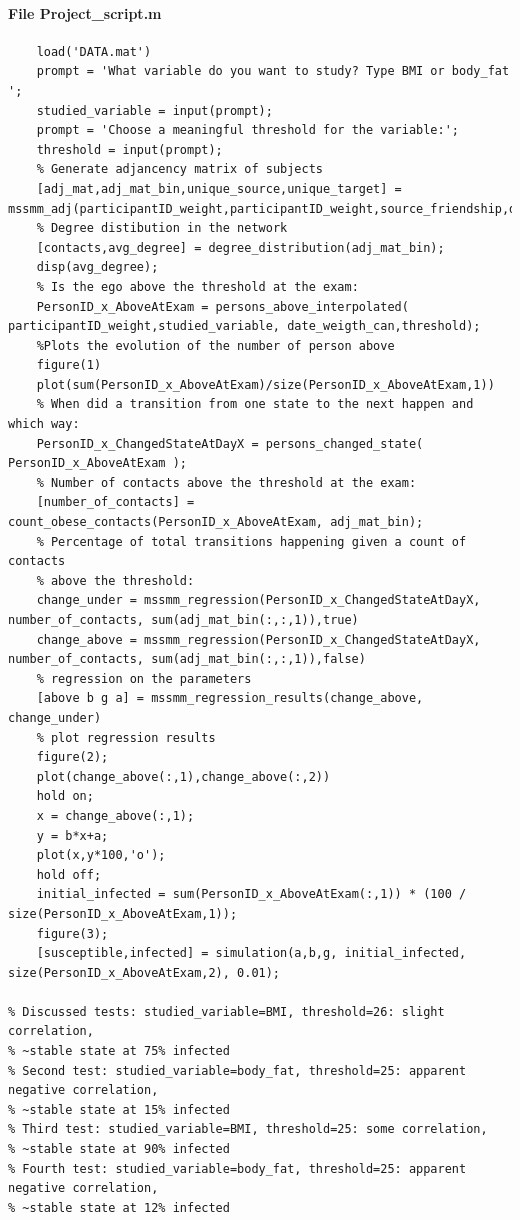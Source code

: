 \documentclass[11pt]{article}
\begin{document}
\paragraph{File Project\_script.m}
\begin{verbatim}
    load('DATA.mat')
    prompt = 'What variable do you want to study? Type BMI or body_fat  ';
    studied_variable = input(prompt);
    prompt = 'Choose a meaningful threshold for the variable:';
    threshold = input(prompt);
    % Generate adjancency matrix of subjects
    [adj_mat,adj_mat_bin,unique_source,unique_target] = mssmm_adj(participantID_weight,participantID_weight,source_friendship,date_friendship_can);
    % Degree distibution in the network
    [contacts,avg_degree] = degree_distribution(adj_mat_bin);
    disp(avg_degree);
    % Is the ego above the threshold at the exam:
    PersonID_x_AboveAtExam = persons_above_interpolated( participantID_weight,studied_variable, date_weigth_can,threshold);
	%Plots the evolution of the number of person above
    figure(1)
    plot(sum(PersonID_x_AboveAtExam)/size(PersonID_x_AboveAtExam,1))
	% When did a transition from one state to the next happen and which way:
    PersonID_x_ChangedStateAtDayX = persons_changed_state( PersonID_x_AboveAtExam );
    % Number of contacts above the threshold at the exam:
    [number_of_contacts] = count_obese_contacts(PersonID_x_AboveAtExam, adj_mat_bin);
    % Percentage of total transitions happening given a count of contacts
    % above the threshold:
    change_under = mssmm_regression(PersonID_x_ChangedStateAtDayX, number_of_contacts, sum(adj_mat_bin(:,:,1)),true)
    change_above = mssmm_regression(PersonID_x_ChangedStateAtDayX, number_of_contacts, sum(adj_mat_bin(:,:,1)),false)
    % regression on the parameters
    [above b g a] = mssmm_regression_results(change_above, change_under)
    % plot regression results
    figure(2);
    plot(change_above(:,1),change_above(:,2))
    hold on;
    x = change_above(:,1);
    y = b*x+a;
    plot(x,y*100,'o');
    hold off;
    initial_infected = sum(PersonID_x_AboveAtExam(:,1)) * (100 / size(PersonID_x_AboveAtExam,1));
    figure(3);
    [susceptible,infected] = simulation(a,b,g, initial_infected, size(PersonID_x_AboveAtExam,2), 0.01);

% Discussed tests: studied_variable=BMI, threshold=26: slight correlation,
% ~stable state at 75% infected
% Second test: studied_variable=body_fat, threshold=25: apparent negative correlation,
% ~stable state at 15% infected
% Third test: studied_variable=BMI, threshold=25: some correlation,
% ~stable state at 90% infected
% Fourth test: studied_variable=body_fat, threshold=25: apparent negative correlation,
% ~stable state at 12% infected

\end{verbatim}
\end{document}
